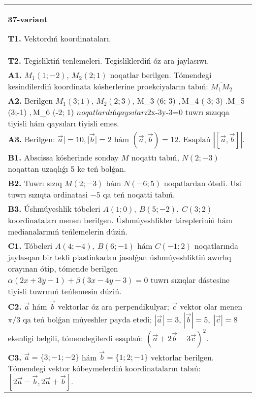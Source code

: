 \documentclass{article}
\begin{document}
\begin{tabular}{m{17cm}}
\textbf{37-variant}

\textbf{T1.} 
Vektordıń koordinataları.
 \\
\textbf{T2.} 
Tegisliktiń tenlemeleri. Tegisliklerdiń óz ara jaylasıwı.
 \\
\textbf{A1.} 
$M_1 (1; -2) $, $M_2 (2; 1) $ noqatlar berilgen.
Tómendegi kesindilerdiń koordinata kósherlerine proekciyaların tabıń: $\overline{M_1M_2}$
 \\
\textbf{A2.} 
Berilgen $M_1 (3; 1) $, $M_2 (2; 3) $, M_3 (6; 3) $,
$M_4 (-3;-3) $. $M_5 (3;-1) $, $M_6 (-2; 1) $ noqatlardıń qaysıları
$2x-3y-3=0 tuwrı sızıqqa tiyisli hám qaysıları tiyisli
emes.
 \\
\textbf{A3.} 
Berilgen: $\overrightarrow{a}| = 10,|\overrightarrow{b}| = 2$ hám
$\left(\overrightarrow{a},\overrightarrow{b} \right) = 12$. Esaplań
$\left| \left\lbrack \overrightarrow{a},\overrightarrow{b} \right\rbrack \right|$.
 \\
\textbf{B1.} 
Abscissa kósherinde sonday $M$ noqattı tabıń,
\(N (2;-3) \) noqattan uzaqlıǵı 5 ke teń bolǵan.
 \\
\textbf{B2.} 
Tuwrı sızıq \(M (2;-3) \) hám \(N (-6;5) \) noqatlardan ótedi.
Usi tuwrı sızıqta ordinatasi $-5$ qa teń noqatti tabıń.
 \\
\textbf{B3.} 
Úshmúyeshlik tóbeleri \(A (1;0),\ B (5;-2),\ C (3;2) \)
koordinataları menen berilgen. Úshmúyeshlikler tárepleriniń hám
medianalarınıń teńlemelerin dúziń.
 \\
\textbf{C1.} 
Tóbeleri \(A (4;-4),\ B (6;-1) \) hám \(C (-1;2) \)
noqatlarında jaylasqan bir tekli plastinkadan jasalǵan úshmúyeshliktiń
awırlıq orayınan ótip, tómende berilgen 
\(\alpha (2x+3y-1) +\beta (3x-4y-3) =0\) tuwrı sızıqlar dástesine 
tiyisli tuwrınıń teńlemesin dúziń.
 \\
\textbf{C2.} 
$\vec{a}$ hám $\vec{b}$ vektorlar óz ara perpendikulyar; $\vec{c}$ vektor olar menen $\pi/3$ qa teń bolǵan múyeshler payda etedi; $|\vec{a}| = 3$, $|\vec{b}| = 5,\ |\vec{c}| = 8$ ekenligi belgili, tómendegilerdi esaplań:
$ (\vec{a} + 2\vec{b} - 3\vec{c}) ^{2}$.
 \\
\textbf{C3.} 
$\vec{a} = \{ 3; - 1; - 2\}$ hám $\vec{b} = \{ 1;2; - 1\}$ vektorlar berilgen. Tómendegi vektor kóbeymelerdiń koordinataların tabıń:
$\left\lbrack 2\vec{a} - \vec{b},2\vec{a} + \vec{b} \right\rbrack$.
 \\

\end{tabular}
\vspace{1cm}
\end{document}
